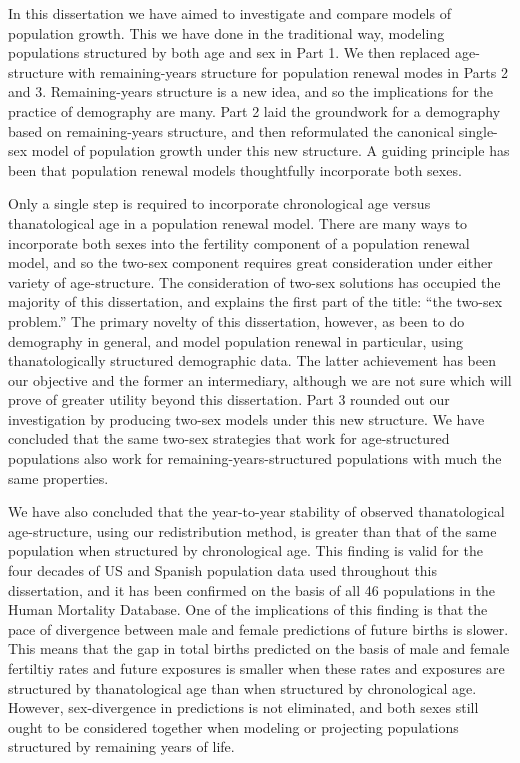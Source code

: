 
In this dissertation we have aimed to investigate and compare models of
population growth. This we have done in the traditional way, modeling populations 
structured by both age and sex in Part 1. We then replaced age-structure with remaining-years
structure for population renewal modes in Parts 2 and 3. Remaining-years
structure is a new idea, and so the implications for the practice of demography are many. Part
2 laid the groundwork for a demography based on remaining-years
structure, and then reformulated the canonical single-sex model of population
growth under this new structure. A guiding principle has been that
population renewal models thoughtfully incorporate both sexes. 

Only a single step is required to incorporate chronological age versus
thanatological age in a population renewal model. There are many ways to incorporate both sexes
into the fertility component of a population renewal model, and so the 
two-sex component requires great consideration under either
variety of age-structure. The consideration of two-sex solutions has occupied
the majority of this dissertation, and explains the first part of 
the title: ``the two-sex problem.'' The primary
novelty of this dissertation, however, as been to do demography in general, and
model population renewal in particular, using thanatologically structured
demographic data. The latter achievement has been our objective and the former
an intermediary, although we are not sure which will prove of greater utility
beyond this dissertation. Part 3 rounded out our investigation by producing
two-sex models under this new structure. We have concluded that the same two-sex 
strategies that work for age-structured populations also work for
remaining-years-structured populations with much the same properties.

We have also concluded that the year-to-year stability of observed
thanatological age-structure, using our redistribution method, is
greater than that of the same population when structured by
chronological age. This finding is valid for the four decades of US and
Spanish population data used throughout this dissertation, and it has been
confirmed on the basis of all 46 populations in the Human Mortality Database.
One of the implications of this finding is that the pace of
divergence between male and female predictions of future births is slower. This
means that the gap in total births predicted on the basis of male and female fertiltiy rates
and future exposures is smaller when these rates and exposures are structured
by thanatological age than when structured by chronological age. However,
sex-divergence in predictions is not eliminated, and both sexes still ought to
be considered together when modeling or projecting populations structured
by remaining years of life.

